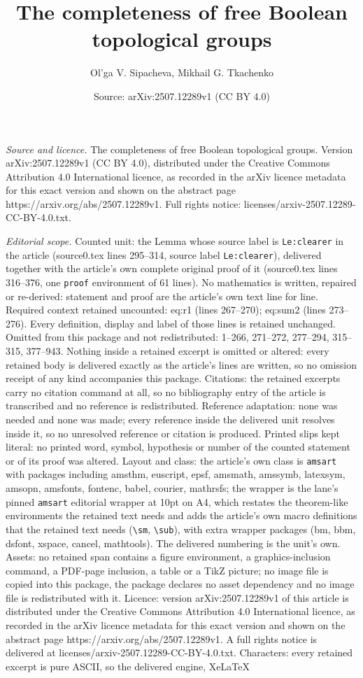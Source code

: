 \documentclass[10pt,a4paper]{amsart}
\title[The completeness of free Boolean topological groups]{The completeness of free Boolean topological groups}
\author{Ol'ga V. Sipacheva, Mikhail G. Tkachenko}
\date{Source: arXiv:2507.12289v1 (CC BY 4.0)}
\begin{document}
\maketitle

\noindent\emph{Source and licence.} The completeness of free Boolean topological groups. Version arXiv:2507.12289v1 (CC BY 4.0), distributed under the Creative Commons Attribution 4.0 International licence, as recorded in the arXiv licence metadata for this exact version and shown on the abstract page https://arxiv.org/abs/2507.12289v1. Full rights notice: licenses/arxiv-2507.12289-CC-BY-4.0.txt.\par\smallskip

\noindent\textit{Editorial scope.} Counted unit: the Lemma whose source label is \texttt{Le:clearer} in the article (source0.tex lines 295--314, source label \texttt{Le:clearer}), delivered together with the article's own complete original proof of it (source0.tex lines 316--376, one \texttt{proof} environment of 61 lines). No mathematics is written, repaired or re-derived: statement and proof are the article's own text line for line. Required context retained uncounted: eq:r1 (lines 267--270); eq:sum2 (lines 273--276). Every definition, display and label of those lines is retained unchanged. Omitted from this package and not redistributed: 1--266, 271--272, 277--294, 315--315, 377--943. Nothing inside a retained excerpt is omitted or altered: every retained body is delivered exactly as the article's lines are written, so no omission receipt of any kind accompanies this package. Citations: the retained excerpts carry no citation command at all, so no bibliography entry of the article is transcribed and no reference is redistributed. Reference adaptation: none was needed and none was made; every reference inside the delivered unit resolves inside it, so no unresolved reference or citation is produced. Printed slips kept literal: no printed word, symbol, hypothesis or number of the counted statement or of its proof was altered. Layout and class: the article's own class is \texttt{amsart} with packages including amsthm, euscript, epsf, amsmath, amssymb, latexsym, amsopn, amsfonts, fontenc, babel, courier, mathrsfs; the wrapper is the lane's pinned \texttt{amsart} editorial wrapper at 10pt on A4, which restates the theorem-like environments the retained text needs and adds the article's own macro definitions that the retained text needs (\texttt{\textbackslash sm}, \texttt{\textbackslash sub}), with extra wrapper packages (bm, bbm, dsfont, xspace, cancel, mathtools). The delivered numbering is the unit's own. Assets: no retained span contains a figure environment, a graphics-inclusion command, a PDF-page inclusion, a table or a TikZ picture; no image file is copied into this package, the package declares no asset dependency and no image file is redistributed with it. Licence: version arXiv:2507.12289v1 of this article is distributed under the Creative Commons Attribution 4.0 International licence, as recorded in the arXiv licence metadata for this exact version and shown on the abstract page https://arxiv.org/abs/2507.12289v1. A full rights notice is delivered at licenses/arxiv-2507.12289-CC-BY-4.0.txt. Characters: every retained excerpt is pure ASCII, so the delivered engine, XeLaTeX 
\end{document}

